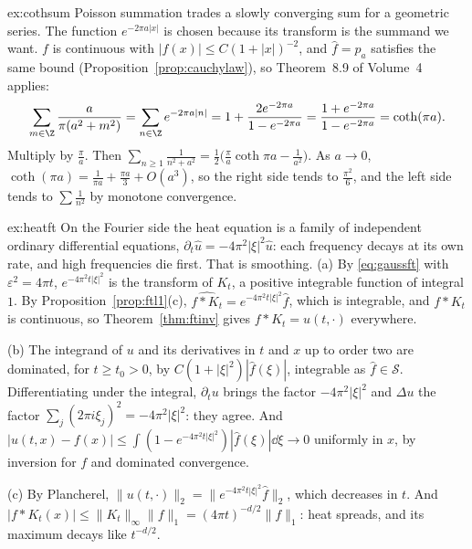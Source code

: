 \begin{solution}{ex:cothsum}
\idea Poisson summation trades a slowly converging sum for a geometric series. The function $e^{-2\pi a|x|}$ is chosen because its transform is the summand we want.
\writeup $f$ is continuous with $|f(x)|\le C(1+|x|)^{-2}$, and $\hat f=p_a$ satisfies the same bound (Proposition~\ref{prop:cauchylaw}), so Theorem~8.9 of Volume~4 applies:
\[\sum_{m\in\Z}\frac a{\pi(a^2+m^2)}=\sum_{n\in\Z}e^{-2\pi a|n|}=1+\frac{2e^{-2\pi a}}{1-e^{-2\pi a}}=\frac{1+e^{-2\pi a}}{1-e^{-2\pi a}}=\coth(\pi a).\]
Multiply by $\frac\pi a$. Then $\sum_{n\ge1}\frac1{n^2+a^2}=\frac12\bigl(\frac\pi a\coth\pi a-\frac1{a^2}\bigr)$. As $a\to0$, $\coth(\pi a)=\frac1{\pi a}+\frac{\pi a}3+O(a^3)$, so the right side tends to $\frac{\pi^2}6$, and the left
side tends to $\sum\frac1{n^2}$ by monotone convergence.
\end{solution}

\begin{solution}{ex:heatft}
\idea On the Fourier side the heat equation is a family of independent ordinary differential equations, $\partial_t\hat u=-4\pi^2|\xi|^2\hat u$: each frequency decays at its own rate, and high frequencies die first.
That is smoothing.
\writeup (a) By \eqref{eq:gaussft} with $\varepsilon^2=4\pi t$, $e^{-4\pi^2t|\xi|^2}$ is the transform of $K_t$, a positive integrable function of integral $1$. By Proposition~\ref{prop:ftl1}(c), $\widehat{f*K_t}=e^{-4\pi^2t|\xi|^2}\hat f$, which is
integrable, and $f*K_t$ is continuous, so Theorem~\ref{thm:ftinv} gives $f*K_t=u(t,\cdot)$ everywhere.

(b) The integrand of $u$ and its derivatives in $t$ and $x$ up to order two are dominated, for $t\ge t_0>0$, by $C(1+|\xi|^2)|\hat f(\xi)|$, integrable as $\hat f\in\mathcal S$. Differentiating under the integral,
$\partial_tu$ brings the factor $-4\pi^2|\xi|^2$ and $\Delta u$ the factor $\sum_j(2\pi i\xi_j)^2=-4\pi^2|\xi|^2$: they agree. And $|u(t,x)-f(x)|\le\int(1-e^{-4\pi^2t|\xi|^2})|\hat f(\xi)|\dd\xi\to0$ uniformly in $x$, by inversion for $f$ and
dominated convergence.

(c) By Plancherel, $\|u(t,\cdot)\|_2=\|e^{-4\pi^2t|\xi|^2}\hat f\|_2$, which decreases in $t$. And $|f*K_t(x)|\le\|K_t\|_\infty\|f\|_1=(4\pi t)^{-d/2}\|f\|_1$: heat spreads, and its maximum decays like $t^{-d/2}$.
\end{solution}

